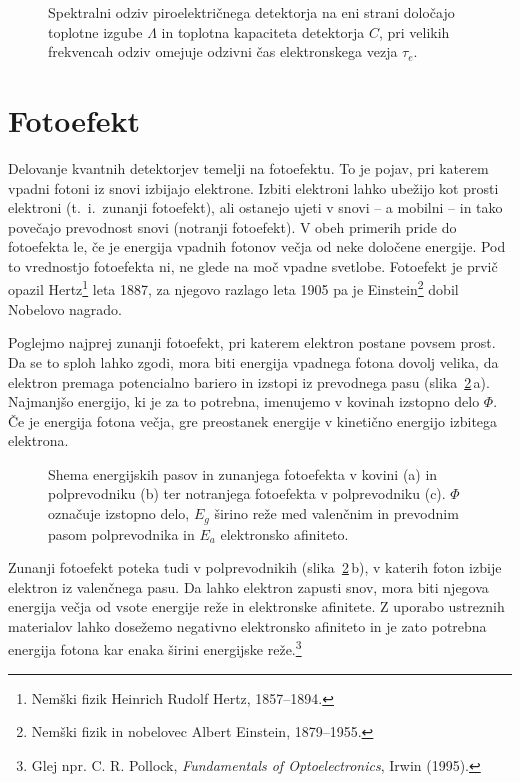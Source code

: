 \begin{figure}[h]
\centering
\def\svgwidth{100truemm} 

\caption{Spektralni odziv piroelektričnega detektorja na eni strani določajo toplotne izgube 
$\Lambda$ in toplotna kapaciteta detektorja $C$, pri velikih frekvencah 
odziv omejuje odzivni čas elektronskega vezja $\tau_e$.}
\label{fig:Piro}
\end{figure}
\pagebreak
\section{Fotoefekt}
Delovanje kvantnih detektorjev temelji na fotoefektu. 
To je pojav, pri katerem vpadni
fotoni iz snovi izbijajo elektrone. Izbiti elektroni lahko ubežijo kot prosti elektroni
(t.\ i.\ zunanji fotoefekt),
ali ostanejo ujeti v snovi -- a mobilni -- in tako povečajo 
prevodnost snovi (notranji fotoefekt). 
V obeh primerih pride do fotoefekta le, 
če je energija vpadnih fotonov večja od neke določene energije.
Pod to vrednostjo fotoefekta ni, ne glede na moč vpadne svetlobe.
Fotoefekt je prvič opazil Hertz\footnote{Nemški fizik Heinrich Rudolf Hertz, 1857--1894.} 
leta 1887, za njegovo razlago leta
1905 pa je Einstein\footnote{Nemški fizik in nobelovec Albert Einstein, 1879--1955.} 
dobil Nobelovo nagrado. 

Poglejmo najprej zunanji fotoefekt, pri katerem elektron postane povsem prost. 
Da se to sploh lahko zgodi, mora biti energija vpadnega fotona dovolj velika, da 
elektron premaga potencialno bariero in izstopi iz prevodnega pasu (slika~\ref{fig:Nivoji}\,a). 
Najmanjšo energijo, ki je za to potrebna, imenujemo v kovinah izstopno delo $\Phi$. 
Če je energija fotona večja, gre preostanek energije v kinetično energijo izbitega
elektrona.

\begin{figure}[h]
\centering
\def\svgwidth{140truemm} 

\caption{Shema energijskih pasov in zunanjega fotoefekta v kovini (a) in polprevodniku (b) ter
notranjega fotoefekta v polprevodniku (c). $\Phi$ označuje izstopno delo, $E_g$ širino reže 
med valenčnim in prevodnim pasom polprevodnika in $E_a$ elektronsko afiniteto. }
\label{fig:Nivoji}
\end{figure}

Zunanji fotoefekt poteka tudi v polprevodnikih (slika~\ref{fig:Nivoji}\,b),
v katerih foton izbije elektron iz valenčnega pasu. Da lahko elektron zapusti snov,
mora biti njegova energija večja od vsote energije reže in elektronske afinitete.
Z uporabo ustreznih materialov lahko dosežemo negativno elektronsko afiniteto
in je zato potrebna energija fotona kar enaka širini energijske 
reže.\footnote{Glej npr. C. R. Pollock, {\it Fundamentals of Optoelectronics}, Irwin (1995).}

